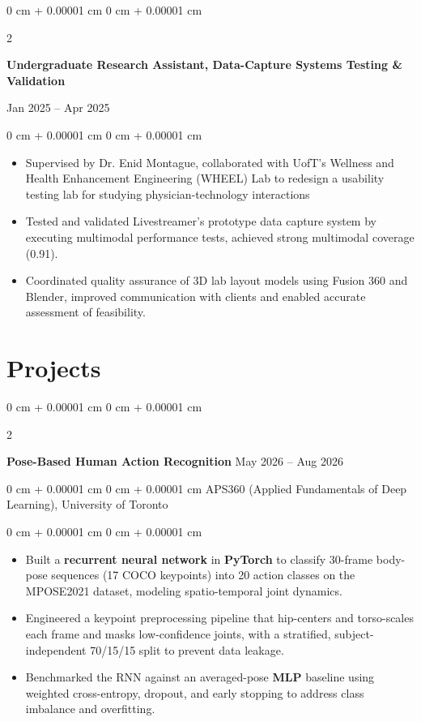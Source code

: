 \documentclass[10pt, letterpaper]{article}
\newenvironment{highlights}{
    \begin{itemize}[
        topsep=0.05 cm,
        parsep=0.05 cm,
        partopsep=0pt,
        itemsep=0pt,
        leftmargin=0 cm + 10pt
    ]
}{
    \end{itemize}
} %
\newenvironment{onecolentry}{
    \begin{adjustwidth}{
        0 cm + 0.00001 cm
    }{
        0 cm + 0.00001 cm
    }
}{
    \end{adjustwidth}
} %
\newenvironment{twocolentry}[2][]{
    \onecolentry
    \def\secondColumn{#2}
    \setcolumnwidth{\fill, 4.5 cm}
    \begin{paracol}{2}
}{
    \switchcolumn \raggedleft \secondColumn
    \end{paracol}
    \endonecolentry
} %
\begin{document}
        \begin{twocolentry}{Jan 2025 -- Apr 2025}
            \textbf{Undergraduate Research Assistant, Data-Capture Systems Testing \& Validation}
            
        \end{twocolentry}

        \vspace{0.05 cm}
        \begin{onecolentry}
            \begin{highlights}
                \item Supervised by Dr. Enid Montague, collaborated with UofT's Wellness and Health Enhancement Engineering (WHEEL) Lab to redesign a usability testing lab for studying physician-technology interactions
                \item Tested and validated Livestreamer's prototype data capture system by executing multimodal performance tests, achieved strong multimodal coverage (0.91).
                \item Coordinated quality assurance of 3D lab layout models using Fusion 360 and Blender, improved communication with clients and enabled accurate assessment of feasibility.
            \end{highlights}
        \end{onecolentry}
        
    \section{Projects}

         \begin{twocolentry}{May 2026 -- Aug 2026}
            \textbf{Pose-Based Human Action Recognition}\end{twocolentry}
        \begin{onecolentry}{APS360 (Applied Fundamentals of Deep Learning), University of Toronto}\end{onecolentry}

             \vspace{0.05 cm}
            \begin{onecolentry}
                \begin{highlights}
                \item Built a \textbf{recurrent neural network} in \textbf{PyTorch} to classify 30-frame body-pose sequences (17 COCO keypoints) into 20 action classes on the MPOSE2021 dataset, modeling spatio-temporal joint dynamics.
                \item Engineered a keypoint preprocessing pipeline that hip-centers and torso-scales each frame and masks low-confidence joints, with a stratified, subject-independent 70/15/15 split to prevent data leakage.
                \item Benchmarked the RNN against an averaged-pose \textbf{MLP} baseline using weighted cross-entropy, dropout, and early stopping to address class imbalance and overfitting.
            \end{highlights}
        \end{onecolentry}
\end{document}
